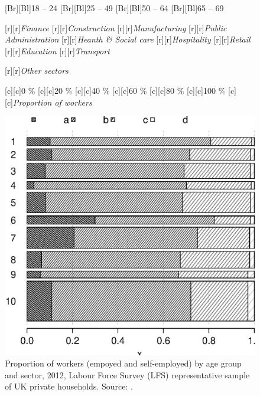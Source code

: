 \documentclass[11 pt, a4paper]{report}
\begin{document}
\begin{figure}[hbtp!]
[Br][Bl]{\small{18 -- 24}}
[Br][Bl]{\small{25 -- 49}}
[Br][Bl]{\small{50 -- 64}}
[Br][Bl]{\small{65 -- 69}}


[r][r]{\small{\emph{Finance}}}
[r][r]{\small{\emph{Construction}}}
[r][r]{\small{\emph{Manufacturing}}}
[r][r]{\small{\emph{Public Administration}}}
[r][r]{\small{\emph{Heanth \& Social care}}}
[r][r]{\small{\emph{Hospitality}}}
[r][r]{\small{\emph{Retail}}}
[r][r]{\small{\emph{Education}}}
[r][r]{\small{\emph{Transport}}}

[r][r]{\small{\emph{Other sectors}}}

[c][c]{\small{0 \%}}
[c][c]{\small{20 \%}}
[c][c]{\small{40 \%}}
[c][c]{\small{60 \%}}
[c][c]{\small{80 \%}}
[c][c]{\small{100 \%}}
[c][c]{\small{\emph{Proportion of workers}}}


\includegraphics[width=\textwidth]{../figures/Fig5.1.eps}
\caption{Proportion of workers (empoyed and self-employed) by age group and sector, 2012, Labour Force Survey (LFS) representative sample of UK private households. Source: \citet{DWP2013}.}\label{Fig:51}
\end{figure}
\end{document}
